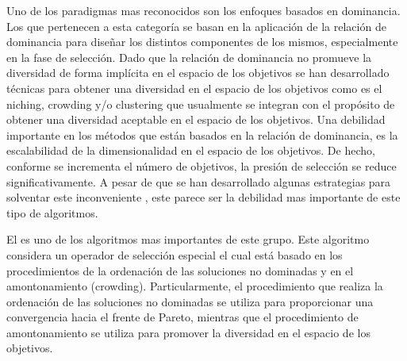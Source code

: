 Uno de los paradigmas mas reconocidos son los enfoques basados en dominancia.
%
Los \MOEAS{} que pertenecen a esta categoría se basan en la aplicación de la relación de dominancia para diseñar los distintos componentes de los mismos, especialmente en la fase de selección.
%
Dado que la relación de dominancia no promueve la diversidad de forma implícita en el espacio de los objetivos se han desarrollado técnicas para obtener una diversidad en el espacio de los objetivos como es el niching, crowding y/o clustering que usualmente se integran con el propósito de obtener una diversidad aceptable en el espacio de los objetivos.
%
Una debilidad importante en los métodos que están basados en la relación de dominancia, es la escalabilidad de la dimensionalidad en el espacio de los objetivos.
%
De hecho, conforme se incrementa el número de objetivos, la presión de selección se reduce significativamente.
%
A pesar de que se han desarrollado algunas estrategias para solventar este inconveniente \cite{horoba2008benefits}, este parece ser la debilidad mas importante de este tipo de algoritmos.

El \NSGAII{} es uno de los algoritmos mas importantes de este grupo.
%
Este algoritmo~\cite{Joel:NSGAII} considera un operador de selección especial el cual está basado en los procedimientos de la ordenación de las soluciones no dominadas y en el amontonamiento (crowding).
%
Particularmente, el procedimiento que realiza la ordenación de las soluciones no dominadas se utiliza para proporcionar una convergencia hacia el frente de Pareto, mientras que el procedimiento de amontonamiento se utiliza para promover la diversidad en el espacio de los objetivos.
%
%

